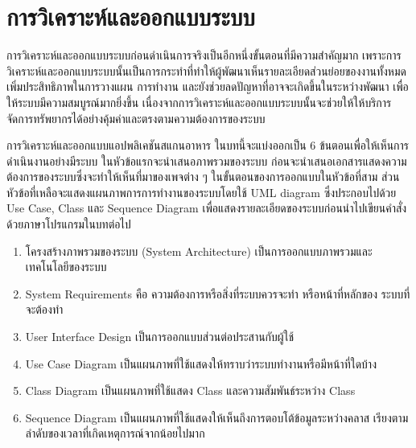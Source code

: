 \chapter{การวิเคราะห์และออกแบบระบบ}

การวิเคราะห์และออกแบบระบบก่อนดำเนินการจริงเป็นอีกหนึ่งขั้นตอนที่มีความสำคัญมาก เพราะการวิเคราะห์และออกแบบระบบนั้นเป็นการกระทำที่ทำให้ผู้พัฒนาเห็นรายละเอียดส่วนย่อยของงานทั้งหมด เพิ่มประสิทธิภาพในการวางแผน การทำงาน และยังช่วยลดปัญหาที่อาจจะเกิดขึ้นในระหว่างพัฒนา เพื่อให้ระบบมีความสมบูรณ์มากยิ่งขึ้น เนื่องจากการวิเคราะห์และออกแบบระบบนั้นจะช่วยให้ให้บริการ จัดการทรัพยากรได้อย่างคุ้มค่าและตรงตามความต้องการของระบบ

การวิเคราะห์และออกแบบแอปพลิเคชันสแกนอาหาร ในบทนี้จะแบ่งออกเป็น 6 ข้นตอนเพื่อให้เห็นการดำเนินงานอย่างมีระบบ ในหัวข้อแรกจะนำเสนอภาพรวมของระบบ ก่อนจะนำเสนอเอกสารแสดงความต้องการของระบบซึ่งจะทำให้เห็นที่มาของเพจต่าง ๆ ในขั้นตอนของการออกแบบในหัวข้อที่สาม ส่วนหัวข้อที่เหลือจะแสดงแผนภาพการการทำงานของระบบโดยใช้ UML diagram ซึ่งประกอบไปด้วย Use Case, Class และ Sequence Diagram เพื่อแสดงรายละเอียดของระบบก่อนนำไปเขียนคำสั่งด้วยภาษาโปรแกรมในบทต่อไป

\begin{enumerate}[label=3.\arabic*]
	\item โครงสร้างภาพรวมของระบบ (System Architecture) เป็นการออกแบบภาพรวมและเทคโนโลยีของระบบ
	\item System Requirements คือ ความต้องการหรือสิ่งที่ระบบควรจะทำ หรือหน้าที่หลักของ
	ระบบที่จะต้องทำ
	\item User Interface Design เป็นการออกแบบส่วนต่อประสานกับผู้ใช้
	\item Use Case Diagram เป็นแผนภาพที่ใช้แสดงให้ทราบว่าระบบทำงานหรือมีหน้าที่ใดบ้าง
	\item Class Diagram เป็นแผนภาพที่ใช้แสดง Class และความสัมพันธ์ระหว่าง Class
	\item Sequence Diagram เป็นแผนภาพที่ใช้แสดงให้เห็นถึงการตอบโต้ข้อมูลระหว่างคลาส เรียงตามลำดับของเวลาที่เกิดเหตุการณ์จากน้อยไปมาก
\end{enumerate}	

